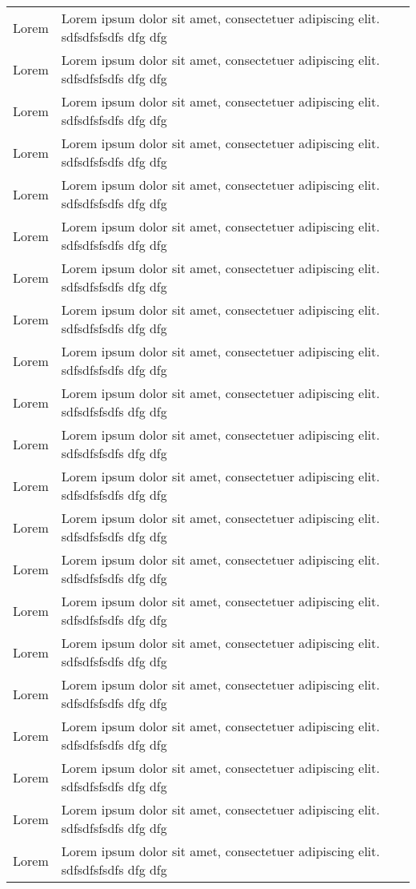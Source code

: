 \begin{longtable}{|>{\small\setlength\hsize{.5\hsize}}X|>{\small\setlength\hsize{1.5\hsize}}X|}
Lorem & Lorem ipsum dolor sit amet, consectetuer adipiscing elit. sdfsdfsfsdfs dfg dfg\\
Lorem & Lorem ipsum dolor sit amet, consectetuer adipiscing elit. sdfsdfsfsdfs dfg dfg\\
Lorem & Lorem ipsum dolor sit amet, consectetuer adipiscing elit. sdfsdfsfsdfs dfg dfg\\
Lorem & Lorem ipsum dolor sit amet, consectetuer adipiscing elit. sdfsdfsfsdfs dfg dfg\\
Lorem & Lorem ipsum dolor sit amet, consectetuer adipiscing elit. sdfsdfsfsdfs dfg dfg\\
Lorem & Lorem ipsum dolor sit amet, consectetuer adipiscing elit. sdfsdfsfsdfs dfg dfg\\
Lorem & Lorem ipsum dolor sit amet, consectetuer adipiscing elit. sdfsdfsfsdfs dfg dfg\\
Lorem & Lorem ipsum dolor sit amet, consectetuer adipiscing elit. sdfsdfsfsdfs dfg dfg\\
Lorem & Lorem ipsum dolor sit amet, consectetuer adipiscing elit. sdfsdfsfsdfs dfg dfg\\
Lorem & Lorem ipsum dolor sit amet, consectetuer adipiscing elit. sdfsdfsfsdfs dfg dfg\\
Lorem & Lorem ipsum dolor sit amet, consectetuer adipiscing elit. sdfsdfsfsdfs dfg dfg\\
Lorem & Lorem ipsum dolor sit amet, consectetuer adipiscing elit. sdfsdfsfsdfs dfg dfg\\
Lorem & Lorem ipsum dolor sit amet, consectetuer adipiscing elit. sdfsdfsfsdfs dfg dfg\\
Lorem & Lorem ipsum dolor sit amet, consectetuer adipiscing elit. sdfsdfsfsdfs dfg dfg\\
Lorem & Lorem ipsum dolor sit amet, consectetuer adipiscing elit. sdfsdfsfsdfs dfg dfg\\
Lorem & Lorem ipsum dolor sit amet, consectetuer adipiscing elit. sdfsdfsfsdfs dfg dfg\\
Lorem & Lorem ipsum dolor sit amet, consectetuer adipiscing elit. sdfsdfsfsdfs dfg dfg\\
Lorem & Lorem ipsum dolor sit amet, consectetuer adipiscing elit. sdfsdfsfsdfs dfg dfg\\
Lorem & Lorem ipsum dolor sit amet, consectetuer adipiscing elit. sdfsdfsfsdfs dfg dfg\\
Lorem & Lorem ipsum dolor sit amet, consectetuer adipiscing elit. sdfsdfsfsdfs dfg dfg\\
Lorem & Lorem ipsum dolor sit amet, consectetuer adipiscing elit. sdfsdfsfsdfs dfg dfg\\

\end{longtable}
